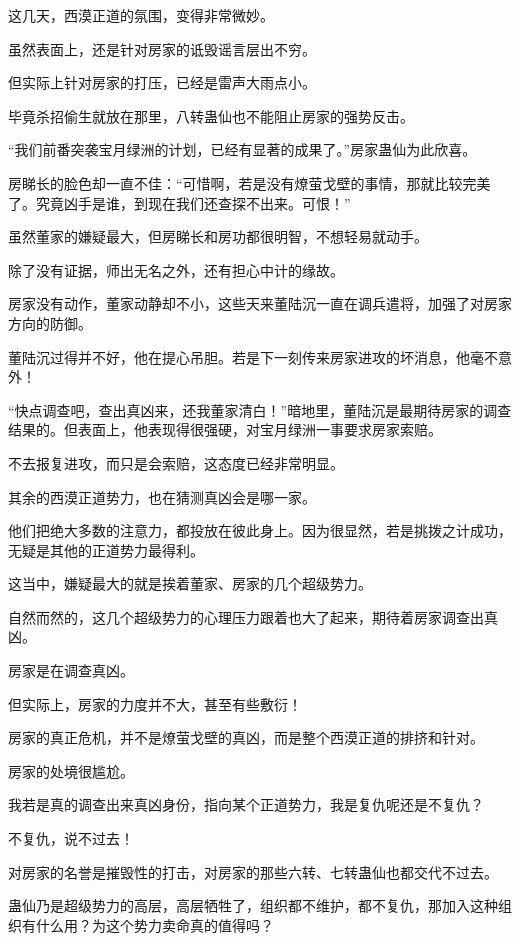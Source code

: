 
\begin{this_body}

这几天，西漠正道的氛围，变得非常微妙。

虽然表面上，还是针对房家的诋毁谣言层出不穷。

但实际上针对房家的打压，已经是雷声大雨点小。

毕竟杀招偷生就放在那里，八转蛊仙也不能阻止房家的强势反击。

“我们前番突袭宝月绿洲的计划，已经有显著的成果了。”房家蛊仙为此欣喜。

房睇长的脸色却一直不佳：“可惜啊，若是没有燎萤戈壁的事情，那就比较完美了。究竟凶手是谁，到现在我们还查探不出来。可恨！”

虽然董家的嫌疑最大，但房睇长和房功都很明智，不想轻易就动手。

除了没有证据，师出无名之外，还有担心中计的缘故。

房家没有动作，董家动静却不小，这些天来董陆沉一直在调兵遣将，加强了对房家方向的防御。

董陆沉过得并不好，他在提心吊胆。若是下一刻传来房家进攻的坏消息，他毫不意外！

“快点调查吧，查出真凶来，还我董家清白！”暗地里，董陆沉是最期待房家的调查结果的。但表面上，他表现得很强硬，对宝月绿洲一事要求房家索赔。

不去报复进攻，而只是会索赔，这态度已经非常明显。

其余的西漠正道势力，也在猜测真凶会是哪一家。

他们把绝大多数的注意力，都投放在彼此身上。因为很显然，若是挑拨之计成功，无疑是其他的正道势力最得利。

这当中，嫌疑最大的就是挨着董家、房家的几个超级势力。

自然而然的，这几个超级势力的心理压力跟着也大了起来，期待着房家调查出真凶。

房家是在调查真凶。

但实际上，房家的力度并不大，甚至有些敷衍！

房家的真正危机，并不是燎萤戈壁的真凶，而是整个西漠正道的排挤和针对。

房家的处境很尴尬。

我若是真的调查出来真凶身份，指向某个正道势力，我是复仇呢还是不复仇？

不复仇，说不过去！

对房家的名誉是摧毁性的打击，对房家的那些六转、七转蛊仙也都交代不过去。

蛊仙乃是超级势力的高层，高层牺牲了，组织都不维护，都不复仇，那加入这种组织有什么用？为这个势力卖命真的值得吗？


\end{this_body}
